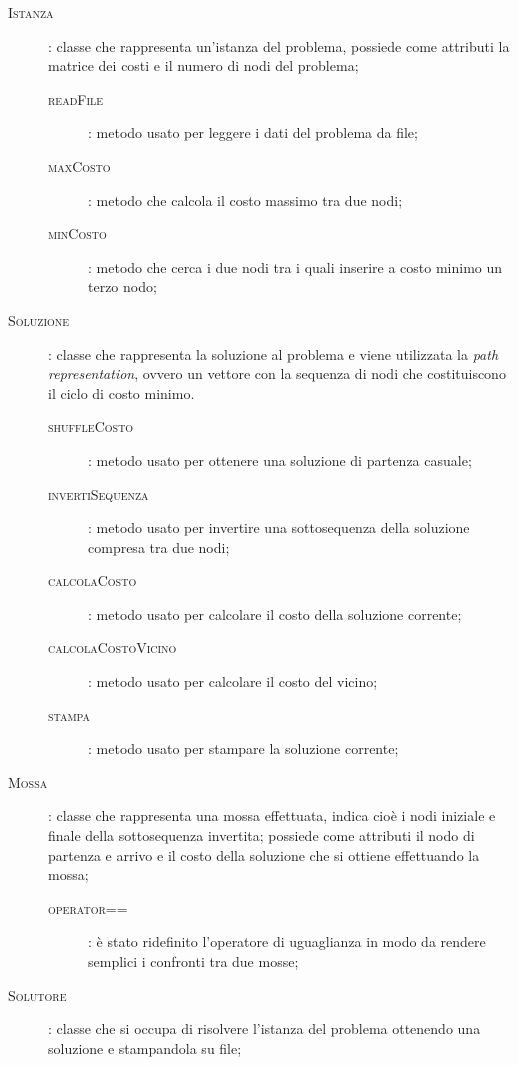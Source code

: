 \begin{description}
	\item[\textsc{Istanza}]: classe che rappresenta un'istanza del problema, possiede come attributi la matrice dei costi e il numero di nodi del problema;
	\begin{description}
		\item[\textsc{readFile}]: metodo usato per leggere i dati del problema da file;
		\item[\textsc{maxCosto}]: metodo che calcola il costo massimo tra due nodi;
		\item[\textsc{minCosto}]: metodo che cerca i due nodi tra i quali inserire a costo minimo un terzo nodo;
	\end{description}
	\item[\textsc{Soluzione}]: classe che rappresenta la soluzione al problema e viene utilizzata la \emph{path representation}, ovvero un vettore con la sequenza di nodi che costituiscono il ciclo di costo minimo.
	\begin{description}
		\item[\textsc{shuffleCosto}]: metodo usato per ottenere una soluzione di partenza casuale;
		\item[\textsc{invertiSequenza}]: metodo usato per invertire una sottosequenza della soluzione compresa tra due nodi;
		\item[\textsc{calcolaCosto}]: metodo usato per calcolare il costo della soluzione corrente;
		\item[\textsc{calcolaCostoVicino}]: metodo usato per calcolare il costo del vicino;
		\item[\textsc{stampa}]: metodo usato per stampare la soluzione corrente;
	\end{description}
	\item[\textsc{Mossa}]: classe che rappresenta una mossa effettuata, indica cioè i nodi iniziale e finale della sottosequenza invertita; possiede come attributi il nodo di partenza e arrivo e il costo della soluzione che si ottiene effettuando la mossa;
	\begin{description}
		\item[\textsc{operator==}]: è stato ridefinito l'operatore di uguaglianza in modo da rendere semplici i confronti tra due mosse;
	\end{description}
	\item[\textsc{Solutore}]: classe che si occupa di risolvere l'istanza del problema ottenendo una soluzione e stampandola su file;
	\begin{description}

\end{description}
\end{description}
